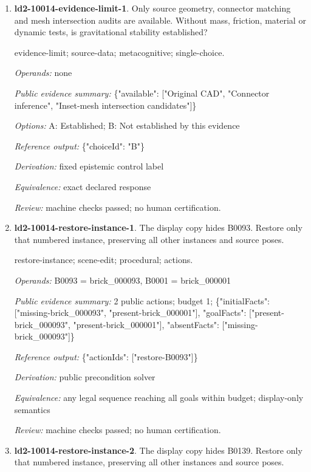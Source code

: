 \begin{enumerate}
\item \textbf{ld2-10014-evidence-limit-1}. Only source geometry, connector matching and mesh intersection audits are available. Without mass, friction, material or dynamic tests, is gravitational stability established?
\par{\small evidence-limit; source-data; metacognitive; single-choice.\par\textit{Operands:} none\par\textit{Public evidence summary:} \{"available": ["Original CAD", "Connector inference", "Inset-mesh intersection candidates"]\}\par\textit{Options:} A: Established; B: Not established by this evidence\par\textit{Reference output:} \{"choiceId": "B"\}\par\textit{Derivation:} fixed epistemic control label\par\textit{Equivalence:} exact declared response\par\textit{Review:} machine checks passed; no human certification.}
\item \textbf{ld2-10014-restore-instance-1}. The display copy hides B0093. Restore only that numbered instance, preserving all other instances and source poses.
\par{\small restore-instance; scene-edit; procedural; actions.\par\textit{Operands:} B0093 = brick\_000093, B0001 = brick\_000001\par\textit{Public evidence summary:} 2 public actions; budget 1; \{"initialFacts": ["missing-brick\_000093", "present-brick\_000001"], "goalFacts": ["present-brick\_000093", "present-brick\_000001"], "absentFacts": ["missing-brick\_000093"]\}\par\textit{Reference output:} \{"actionIds": ["restore-B0093"]\}\par\textit{Derivation:} public precondition solver\par\textit{Equivalence:} any legal sequence reaching all goals within budget; display-only semantics\par\textit{Review:} machine checks passed; no human certification.}
\item \textbf{ld2-10014-restore-instance-2}. The display copy hides B0139. Restore only that numbered instance, preserving all other instances and source poses.

\end{enumerate}
